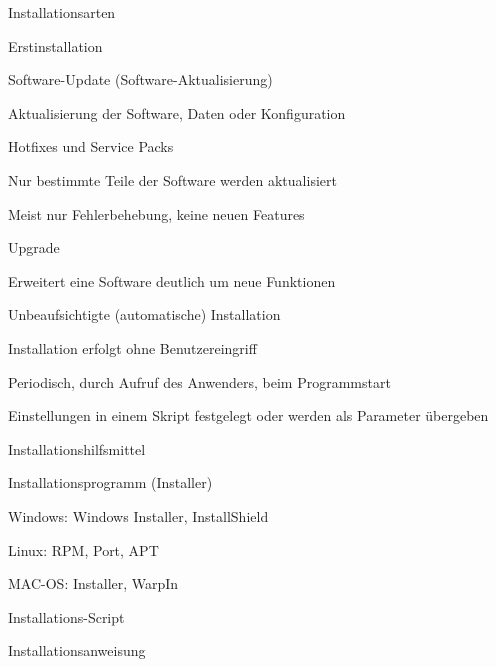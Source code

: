 \documentclass[a4paper]{article}
\begin{document}
\begin{multicols}{3}
  Installationsarten
  \begin{itemize*}
    \item Erstinstallation
    \item Software-Update (Software-Aktualisierung)
          \begin{itemize*}
            \item Aktualisierung der Software, Daten oder Konfiguration
          \end{itemize*}
    \item Hotfixes und Service Packs
          \begin{itemize*}
            \item Nur bestimmte Teile der Software werden aktualisiert
            \item Meist nur Fehlerbehebung, keine neuen Features
          \end{itemize*}
    \item Upgrade
          \begin{itemize*}
            \item Erweitert eine Software deutlich um neue Funktionen
          \end{itemize*}
    \item Unbeaufsichtigte (automatische) Installation
          \begin{itemize*}
            \item Installation erfolgt ohne Benutzereingriff
            \item Periodisch, durch Aufruf des Anwenders, beim Programmstart
            \item Einstellungen in einem Skript festgelegt oder werden als Parameter übergeben
          \end{itemize*}
  \end{itemize*}

  Installationshilfsmittel
  \begin{itemize*}
    \item Installationsprogramm (Installer)
          \begin{itemize*}
            \item Windows: Windows Installer, InstallShield
            \item Linux: RPM, Port, APT
            \item MAC-OS: Installer, WarpIn
          \end{itemize*}
    \item Installations-Script
    \item Installationsanweisung
  \end{itemize*}


\end{multicols}
\end{document}
